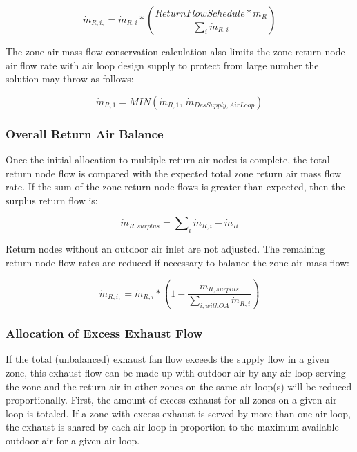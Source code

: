\begin{equation}
{\dot m_{R,i,}} = {\dot m_{R,i}} * \left(\frac{ReturnFlowSchedule*{\dot m_{R}}} {\sum\nolimits_{i} {{{\dot m}_{R,i}}}} \right)
\end{equation}

The zone air mass flow conservation calculation also limits the zone return node air flow rate with air loop design supply to protect from large number the solution may throw as follows:

\begin{equation}
{\dot m_{R,1}} = MIN\left( {{\dot m_{R,1}},\,{{\dot m}_{DesSupply, AirLoop}}} \right)
\end{equation}


\subsubsection{Overall Return Air Balance}\label{overall-return-air-balance}

Once the initial allocation to multiple return air nodes is complete, the total return node flow is compared with the expected total zone return air mass flow rate. If the sum of the zone return node flows is greater than expected, then the surplus return flow is:

\begin{equation}
{\dot m_{R,surplus}} = \sum\nolimits_i {{{\dot m}_{R,i}}} - {\dot m_{R}}
\end{equation}

Return nodes without an outdoor air inlet are not adjusted. The remaining return node flow rates are reduced if necessary to balance the zone air mass flow:

\begin{equation}
{\dot m_{R,i,}} = {\dot m_{R,i}} * \left( 1 - \frac{\dot m_{R,surplus}} {\sum\nolimits_{i,withOA} {{{\dot m}_{R,i}}}} \right)
\end{equation}

\subsubsection{Allocation of Excess Exhaust Flow}\label{allocation-of-excess-exhaust-flow}

If the total (unbalanced) exhaust fan flow exceeds the supply flow in a given zone, this exhaust flow can be made up with outdoor air by any air loop serving the zone and the return air in other zones on the same air loop(s) will be reduced proportionally. First, the amount of excess exhaust for all zones on a given air loop is totaled.  If a zone with excess exhaust is served by more than one air loop, the exhaust is shared by each air loop in proportion to the maximum available outdoor air for a given air loop.

